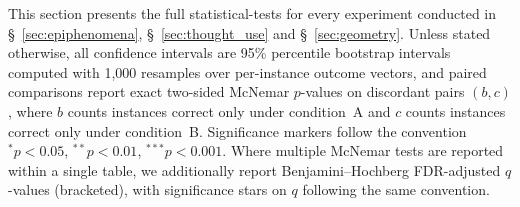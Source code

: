 This section presents the full statistical-tests for every experiment conducted in \S~\ref{sec:epiphenomena}, \S~\ref{sec:thought_use} and \S~\ref{sec:geometry}. Unless stated otherwise, all confidence intervals are 95\% percentile bootstrap intervals computed with 1{,}000 resamples over per-instance outcome vectors, and paired comparisons report exact two-sided McNemar $p$-values on discordant pairs $(b, c)$, where $b$ counts instances correct only under condition~A and $c$ counts instances correct only under condition~B. Significance markers follow the convention $^{*}p{<}0.05$, $^{**}p{<}0.01$, $^{***}p{<}0.001$. Where multiple McNemar tests are reported within a single table, we additionally report Benjamini--Hochberg FDR-adjusted $q$-values (bracketed), with significance stars on $q$ following the same convention.
